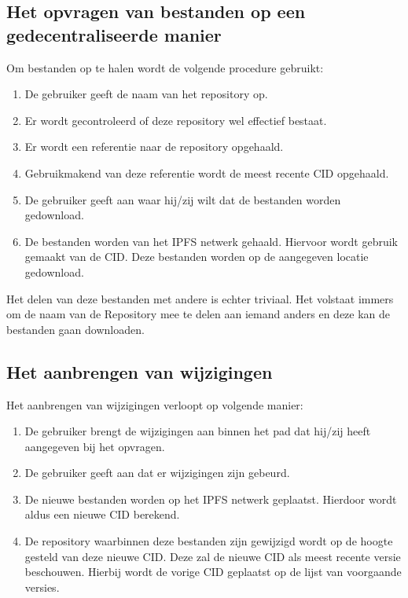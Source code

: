 \subsection{Het opvragen van bestanden op een gedecentraliseerde manier}
Om bestanden op te halen wordt de volgende procedure gebruikt:

\begin{enumerate}
\item De gebruiker geeft de naam van het repository op.\\
\item Er wordt gecontroleerd of deze repository wel effectief bestaat.\\
\item Er wordt een referentie naar de repository opgehaald.\\
\item Gebruikmakend van deze referentie wordt de meest recente CID opgehaald.\\
\item De gebruiker geeft aan waar hij/zij wilt dat de bestanden worden gedownload.
\item De bestanden worden van het IPFS netwerk gehaald. Hiervoor wordt gebruik gemaakt van de CID. Deze bestanden worden op de aangegeven locatie gedownload.
\end{enumerate}

Het delen van deze bestanden met andere is echter triviaal. Het volstaat immers om de naam van de Repository mee te delen aan iemand anders en deze kan de bestanden gaan downloaden.
\subsection{Het aanbrengen van wijzigingen}
Het aanbrengen van wijzigingen verloopt op volgende manier:

\begin{enumerate}
\item De gebruiker brengt de wijzigingen aan binnen het pad dat hij/zij heeft aangegeven bij het opvragen.
\item De gebruiker geeft aan dat er wijzigingen zijn gebeurd.
\item De nieuwe bestanden worden op het IPFS netwerk geplaatst. Hierdoor wordt aldus een nieuwe CID berekend.
\item De repository waarbinnen deze bestanden zijn gewijzigd wordt op de hoogte gesteld van deze nieuwe CID. Deze zal de nieuwe CID als meest recente versie beschouwen. Hierbij wordt de vorige CID geplaatst op de lijst van voorgaande versies.
\end{enumerate}
